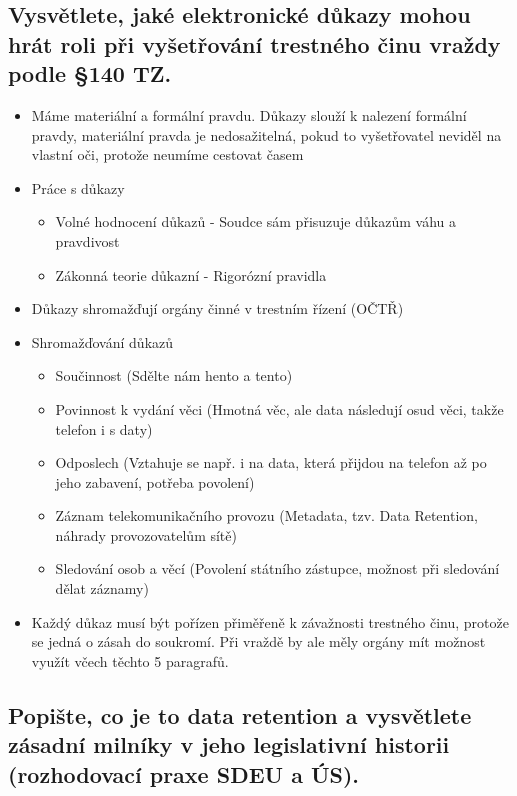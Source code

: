 \subsection{Vysvětlete, jaké elektronické důkazy mohou hrát roli při vyšetřování trestného činu vraždy podle §140 TZ.}
\begin{itemize}
    \item Máme materiální a formální pravdu. Důkazy slouží k nalezení formální pravdy, materiální pravda je nedosažitelná, pokud to vyšetřovatel neviděl na vlastní oči, protože neumíme cestovat časem
    \item Práce s důkazy
    \begin{itemize}
        \item Volné hodnocení důkazů - Soudce sám přisuzuje důkazům váhu a pravdivost
        \item Zákonná teorie důkazní - Rigorózní pravidla
    \end{itemize}
    \item Důkazy shromažďují orgány činné v trestním řízení (OČTŘ)
    \item Shromažďování důkazů
    \begin{itemize}
        \item Součinnost (Sdělte nám hento a tento)
        \item Povinnost k vydání věci (Hmotná věc, ale data následují osud věci, takže telefon i s daty)
        \item Odposlech (Vztahuje se např. i na data, která přijdou na telefon až po jeho zabavení, potřeba povolení)
        \item Záznam telekomunikačního provozu (Metadata, tzv. Data Retention, náhrady provozovatelům sítě)
        \item Sledování osob a věcí (Povolení státního zástupce, možnost při sledování dělat záznamy)
    \end{itemize}
    \item Každý důkaz musí být pořízen přiměřeně k závažnosti trestného činu, protože se jedná o zásah do soukromí. Při vraždě by ale měly orgány mít možnost využít včech těchto 5 paragrafů.
\end{itemize}

\subsection{Popište, co je to data retention a vysvětlete zásadní milníky v jeho legislativní historii (rozhodovací praxe SDEU a ÚS).}

